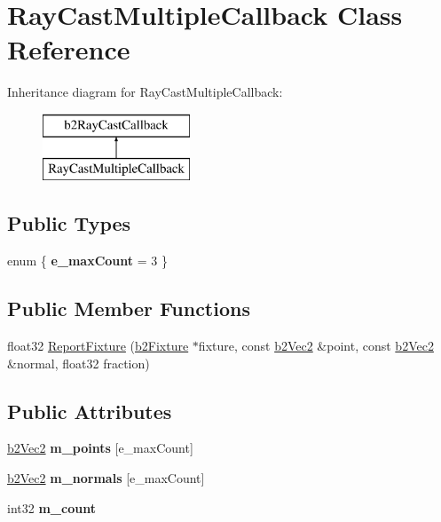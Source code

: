 \hypertarget{class_ray_cast_multiple_callback}{\section{Ray\-Cast\-Multiple\-Callback Class Reference}
\label{class_ray_cast_multiple_callback}
}
Inheritance diagram for Ray\-Cast\-Multiple\-Callback\-:\begin{figure}[H]
\begin{center}
\leavevmode
\includegraphics[height=2.000000cm]{class_ray_cast_multiple_callback}
\end{center}
\end{figure}
\subsection*{Public Types}
\begin{DoxyCompactItemize}
\item 
enum \{ {\bfseries e\-\_\-max\-Count} =  3
 \}
\end{DoxyCompactItemize}
\subsection*{Public Member Functions}
\begin{DoxyCompactItemize}
\item 
float32 \hyperlink{class_ray_cast_multiple_callback_a7251b8332fc2eea398559d0ab797f7c6}{Report\-Fixture} (\hyperlink{classb2_fixture}{b2\-Fixture} $\ast$fixture, const \hyperlink{structb2_vec2}{b2\-Vec2} \&point, const \hyperlink{structb2_vec2}{b2\-Vec2} \&normal, float32 fraction)
\end{DoxyCompactItemize}
\subsection*{Public Attributes}
\begin{DoxyCompactItemize}
\item 
\hypertarget{class_ray_cast_multiple_callback_a71fbd8d11b07d337b29ffe47a4845a86}{\hyperlink{structb2_vec2}{b2\-Vec2} {\bfseries m\-\_\-points} \mbox{[}e\-\_\-max\-Count\mbox{]}}\label{class_ray_cast_multiple_callback_a71fbd8d11b07d337b29ffe47a4845a86}

\item 
\hypertarget{class_ray_cast_multiple_callback_a8d3572ffac4aaa084f53abe0334f228c}{\hyperlink{structb2_vec2}{b2\-Vec2} {\bfseries m\-\_\-normals} \mbox{[}e\-\_\-max\-Count\mbox{]}}\label{class_ray_cast_multiple_callback_a8d3572ffac4aaa084f53abe0334f228c}

\item 
\hypertarget{class_ray_cast_multiple_callback_aa5e6355be1201c54ab48ed1e16cba161}{int32 {\bfseries m\-\_\-count}}\label{class_ray_cast_multiple_callback_aa5e6355be1201c54ab48ed1e16cba161}

\end{DoxyCompactItemize}


